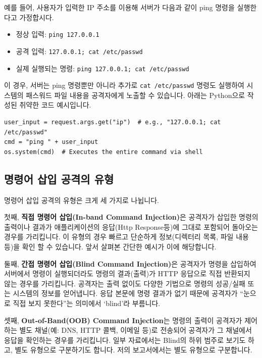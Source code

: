 \documentclass{article}
\begin{document}
예를 들어, 사용자가 입력한 IP 주소를 이용해 서버가 다음과 같이 ping 명령을 실행한다고 가정합시다.

\begin{itemize}
  \item 정상 입력: \texttt{ping 127.0.0.1}
  \item 공격 입력: \texttt{127.0.0.1; cat /etc/passwd}
  \item 실제 실행되는 명령: \texttt{ping 127.0.0.1; cat /etc/passwd}
\end{itemize}

이 경우, 서버는 ping 명령뿐만 아니라 추가로 \texttt{cat /etc/passwd} 명령도 실행하여 시스템의 패스워드 파일 내용을 공격자에게 노출할 수 있습니다.
아래는 Python으로 작성된 취약한 코드 예시입니다.

\begin{lstlisting}[caption={취약한 코드 예시 — ping 명령어에 사용자 입력을 직접 결합}]
user_input = request.args.get("ip")  # e.g., "127.0.0.1; cat /etc/passwd"
cmd = "ping " + user_input
os.system(cmd)  # Executes the entire command via shell
\end{lstlisting}

\subsection*{명령어 삽입 공격의 유형}
명령어 삽입 공격의 유형은 크게 세 가지로 나뉩니다. 

첫째, \textbf{직접 명령어 삽입(In-band Command Injection)}은 공격자가 삽입한 명령의 출력이나 결과가 애플리케이션의 응답(Http Response등)에 그대로 포함되어 돌아오는 경우를 가리킵니다.
이 유형의 경우 빠르고 단순하게 정보(디렉터리 목록, 파일 내용 등)을 확인 할 수 있습니다. 앞서 살펴본 간단한 예시가 이에 해당합니다.

둘째, \textbf{간접 명령어 삽입(Blind Command Injection)}은 공격자가 명령을 삽입하여 서버에서 명령이 실행되더라도 명령의 결과(출력)가 HTTP 응답으로 직접 반환되지 않는 경우를 가리킵니다.
공격자는 출력 없이도 다양한 기법으로 명령의 성공/실패 또는 시스템의 정보를 얻어냅니다. 
응답 본문에 명령 결과가 없기 때문에 공격자가 “눈으로 직접 보지 못한다”는 의미에서 ‘blind’라 부름니다.

셋째, \textbf{Out-of-Band(OOB) Command Injection}는 명령의 출력이 공격자가 제어하는 별도 채널(예: DNS, HTTP 콜백, 이메일 등)로 전송되어 공격자가 그 채널에서 응답을 확인하는 경우를 가리킵니다. 
일부 자료에서는 Blind의 하위 범주로 보기도 하고, 별도 유형으로 구분하기도 합니다. 저의 보고서에서는 별도 유형으로 구분합니다.
\end{document}
